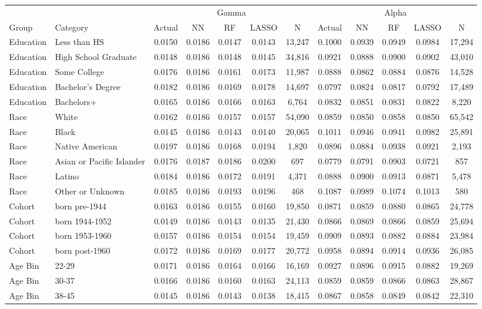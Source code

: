 \begin{tabular}{llccccc|ccccc}
\hline\hline
 &  & \multicolumn{5}{c|}{Gamma} & \multicolumn{5}{c}{Alpha} \\
Group & Category & Actual & NN & RF & LASSO & N & Actual & NN & RF & LASSO & N \\
\hline
Education&Less than HS&0.0150&0.0186&0.0147&0.0143&13,247&0.1000&0.0939&0.0949&0.0984&17,294\\
Education&High School Graduate&0.0148&0.0186&0.0148&0.0145&34,816&0.0921&0.0888&0.0900&0.0902&43,010\\
Education&Some College&0.0176&0.0186&0.0161&0.0173&11,987&0.0888&0.0862&0.0884&0.0876&14,528\\
Education&Bachelor's Degree&0.0182&0.0186&0.0169&0.0178&14,697&0.0797&0.0824&0.0817&0.0792&17,489\\
Education&Bachelors+&0.0165&0.0186&0.0166&0.0163&6,764&0.0832&0.0851&0.0831&0.0822&8,220\\
Race&White&0.0162&0.0186&0.0157&0.0157&54,090&0.0859&0.0850&0.0858&0.0850&65,542\\
Race&Black&0.0145&0.0186&0.0143&0.0140&20,065&0.1011&0.0946&0.0941&0.0982&25,891\\
Race&Native American&0.0197&0.0186&0.0168&0.0194&1,820&0.0896&0.0884&0.0938&0.0921&2,193\\
Race&Asian or Pacific Islander&0.0176&0.0187&0.0186&0.0200&697&0.0779&0.0791&0.0903&0.0721&857\\
Race&Latino&0.0184&0.0186&0.0172&0.0191&4,371&0.0888&0.0900&0.0913&0.0871&5,478\\
Race&Other or Unknown&0.0185&0.0186&0.0193&0.0196&468&0.1087&0.0989&0.1074&0.1013&580\\
Cohort&born pre-1944&0.0163&0.0186&0.0155&0.0160&19,850&0.0871&0.0859&0.0880&0.0865&24,778\\
Cohort&born 1944-1952&0.0149&0.0186&0.0143&0.0135&21,430&0.0866&0.0869&0.0866&0.0859&25,694\\
Cohort&born 1953-1960&0.0157&0.0186&0.0154&0.0154&19,459&0.0909&0.0893&0.0882&0.0884&23,984\\
Cohort&born post-1960&0.0172&0.0186&0.0169&0.0177&20,772&0.0958&0.0894&0.0914&0.0936&26,085\\
Age Bin&22-29&0.0171&0.0186&0.0164&0.0166&16,169&0.0927&0.0896&0.0915&0.0882&19,269\\
Age Bin&30-37&0.0166&0.0186&0.0160&0.0163&24,113&0.0859&0.0859&0.0866&0.0863&28,867\\
Age Bin&38-45&0.0145&0.0186&0.0143&0.0138&18,415&0.0867&0.0858&0.0849&0.0842&22,310\\

\end{tabular}
